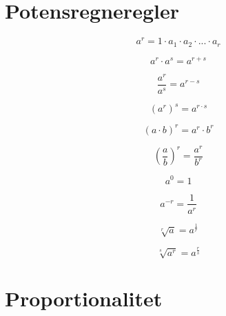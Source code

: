 \documentclass[11pt,a5paper,fleqn,leqno]{book}
\begin{document}
\newpage

\section{Potensregneregler}

\begin{equation} \label{eq:potens}
a^r = 1 \cdot a_1 \cdot a_2 \cdot ... \cdot a_r
\end{equation}

\begin{equation} \label{eq:potens_gange}
a^r \cdot a^s = a^{r+s}
\end{equation}

\begin{equation} \label{eq:potens_dividere}
\dfrac{a^r}{a^s} = a^{r-s}
\end{equation}

\begin{equation} \label{eq:potens_potens}
\left(a^r\right)^s = a^{r \cdot s}
\end{equation}

\begin{equation} \label{eq:potens_faktorer}
\left(a \cdot b\right)^{r} = a^{r} \cdot b^{r}
\end{equation}

\begin{equation} \label{eq:potens_divisor}
\left(\dfrac{a}{b}\right)^{r} = \dfrac{a^{r}}{b^{r}}
\end{equation}

\begin{equation} \label{eq:potens_nulte}
a^{0} = 1
\end{equation}

\begin{equation} \label{eq:potens_minuste}
a^{-r} = \dfrac{1}{a^{r}}
\end{equation}

\begin{equation} \label{eq:potens_kvadratrod}
\sqrt[r]{a} = a^{\frac{1}{r}}
\end{equation}

\begin{equation} \label{eq:potens_kvadratrod_potens}
\sqrt[s]{a^{r}} = a^{\frac{r}{s}}
\end{equation}

\vfill

\section{Proportionalitet}
\end{document}
